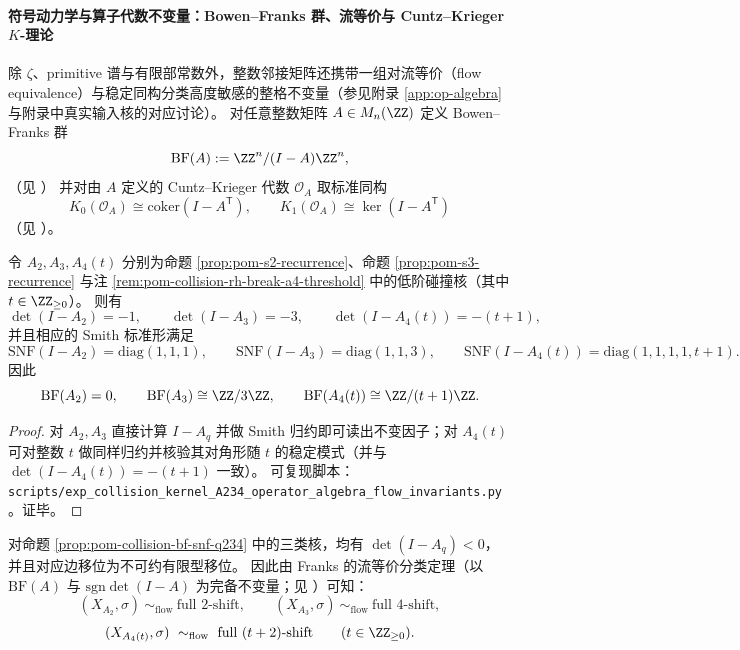 






\paragraph{符号动力学与算子代数不变量：Bowen--Franks 群、流等价与 Cuntz--Krieger \texorpdfstring{$K$}{K}-理论}
除 \(\zeta\)、primitive 谱与有限部常数外，整数邻接矩阵还携带一组对流等价（flow equivalence）与稳定同构分类高度敏感的整格不变量（参见附录 \ref{app:op-algebra} 与附录中真实输入核的对应讨论）。
对任意整数矩阵 \(A\in M_n(\ZZ)\) 定义 Bowen--Franks 群
\[
\mathrm{BF}(A):=\ZZ^n/(I-A)\ZZ^n,
\]
（见 \cite{BowenFranks1977HomologyZeroDim}）
并对由 \(A\) 定义的 Cuntz--Krieger 代数 \(\mathcal O_A\) 取标准同构
\[
K_0(\mathcal O_A)\cong \mathrm{coker}(I-A^\mathsf T),\qquad
K_1(\mathcal O_A)\cong \ker(I-A^\mathsf T)
\]
（见 \cite{CuntzKrieger1980}）。

\begin{proposition}\label{prop:pom-collision-bf-snf-q234}
令 \(A_2,A_3,A_4(t)\) 分别为命题 \ref{prop:pom-s2-recurrence}、命题 \ref{prop:pom-s3-recurrence} 与注 \ref{rem:pom-collision-rh-break-a4-threshold} 中的低阶碰撞核（其中 \(t\in\ZZ_{\ge 0}\)）。
则有
\[
\det(I-A_2)=-1,\qquad \det(I-A_3)=-3,\qquad \det(I-A_4(t))=-(t+1),
\]
并且相应的 Smith 标准形满足
\[
\mathrm{SNF}(I-A_2)=\mathrm{diag}(1,1,1),\qquad
\mathrm{SNF}(I-A_3)=\mathrm{diag}(1,1,3),\qquad
\mathrm{SNF}(I-A_4(t))=\mathrm{diag}(1,1,1,1,t+1).
\]
因此
\[
\mathrm{BF}(A_2)=0,\qquad
\mathrm{BF}(A_3)\cong \ZZ/3\ZZ,\qquad
\mathrm{BF}(A_4(t))\cong \ZZ/(t+1)\ZZ.
\]
\end{proposition}
\begin{proof}
对 \(A_2,A_3\) 直接计算 \(I-A_q\) 并做 Smith 归约即可读出不变因子；对 \(A_4(t)\) 可对整数 \(t\) 做同样归约并核验其对角形随 \(t\) 的稳定模式（并与 \(\det(I-A_4(t))=-(t+1)\) 一致）。
可复现脚本：\texttt{scripts/exp\_collision\_kernel\_A234\_operator\_algebra\_flow\_invariants.py}。证毕。
\end{proof}

\begin{corollary}[低阶碰撞核的流等价类型]\label{cor:pom-collision-flow-equivalence-full-shift}
对命题 \ref{prop:pom-collision-bf-snf-q234} 中的三类核，均有 \(\det(I-A_q)<0\)，并且对应边移位为不可约有限型移位。
因此由 Franks 的流等价分类定理（以 \(\mathrm{BF}(A)\) 与 \(\mathrm{sgn}\det(I-A)\) 为完备不变量；见 \cite{Franks1984FlowEquivalenceSFT}）可知：
\[
(X_{A_2},\sigma)\ \sim_{\mathrm{flow}}\ \text{full }2\text{-shift},\qquad
(X_{A_3},\sigma)\ \sim_{\mathrm{flow}}\ \text{full }4\text{-shift},
\]
\[
(X_{A_4(t)},\sigma)\ \sim_{\mathrm{flow}}\ \text{full }(t+2)\text{-shift}\qquad(t\in\ZZ_{\ge 0}).
\]
\end{corollary}

